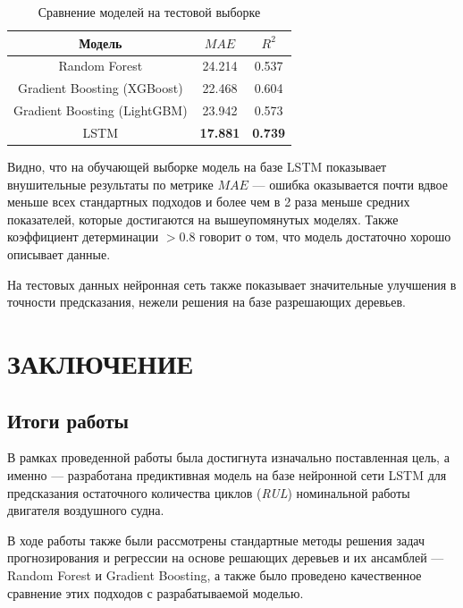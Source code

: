 \documentclass[14pt]{extarticle}
\begin{document}
\begin{center}
	\begin{table}[h]
		\centering
		\begin{tabular}{ccc}
			\hline Модель & $MAE$ &  $R^2$ \\
			\hline Random Forest & 24.214  & 0.537\\
			Gradient Boosting (XGBoost)  & 22.468 & 0.604 \\
			Gradient Boosting (LightGBM)  & 23.942 & 0.573 \\
			LSTM & {\bf 17.881}  & {\bf 0.739}\\
			\hline 
		\end{tabular}
		\caption{Сравнение моделей на тестовой выборке}
		\label{Tab:results2}
	\end{table}
\end{center}

Видно, что на обучающей выборке модель на базе LSTM показывает внушительные результаты по метрике $MAE$ --- ошибка оказывается почти вдвое меньше всех стандартных подходов и более чем в 2 раза меньше средних показателей, которые достигаются на вышеупомянутых моделях. Также коэффициент детерминации $>0.8$ говорит о том, что модель достаточно хорошо описывает данные.



На тестовых данных нейронная сеть также показывает значительные улучшения в точности предсказания, нежели решения на базе разрешающих деревьев.

\newpage

\section{ЗАКЛЮЧЕНИЕ}

\subsection{Итоги работы}

В рамках проведенной работы была достигнута изначально поставленная цель, а именно --- разработана предиктивная модель на базе нейронной сети LSTM для предсказания остаточного количества циклов ({\it RUL}) номинальной работы двигателя воздушного судна. 

В ходе работы также были рассмотрены стандартные методы решения задач прогнозирования и регрессии на основе решающих деревьев и их ансамблей --- Random Forest и Gradient Boosting, а также было проведено качественное сравнение этих подходов с разрабатываемой моделью. 
\end{document}
